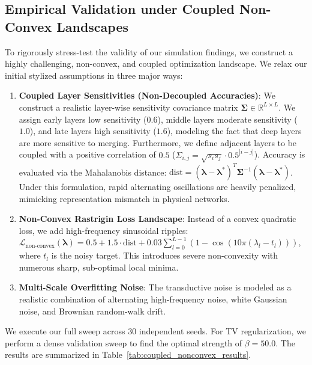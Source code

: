 \subsection{Empirical Validation under Coupled Non-Convex Landscapes}
To rigorously stress-test the validity of our simulation findings, we construct a highly challenging, non-convex, and coupled optimization landscape. We relax our initial stylized assumptions in three major ways:
\begin{enumerate}
    \item \textbf{Coupled Layer Sensitivities (Non-Decoupled Accuracies)}: We construct a realistic layer-wise sensitivity covariance matrix $\boldsymbol{\Sigma} \in \mathbb{R}^{L \times L}$. We assign early layers low sensitivity ($0.6$), middle layers moderate sensitivity ($1.0$), and late layers high sensitivity ($1.6$), modeling the fact that deep layers are more sensitive to merging. Furthermore, we define adjacent layers to be coupled with a positive correlation of $0.5$ ($\Sigma_{i,j} = \sqrt{s_i s_j} \cdot 0.5^{|i-j|}$). Accuracy is evaluated via the Mahalanobis distance: $\text{dist} = (\boldsymbol{\lambda} - \boldsymbol{\lambda}^*)^T \boldsymbol{\Sigma}^{-1} (\boldsymbol{\lambda} - \boldsymbol{\lambda}^*)$. Under this formulation, rapid alternating oscillations are heavily penalized, mimicking representation mismatch in physical networks.
    \item \textbf{Non-Convex Rastrigin Loss Landscape}: Instead of a convex quadratic loss, we add high-frequency sinusoidal ripples: $\mathcal{L}_{\text{non-convex}}(\boldsymbol{\lambda}) = 0.5 + 1.5 \cdot \text{dist} + 0.03 \sum_{l=0}^{L-1} (1 - \cos(10 \pi (\lambda_l - t_l)))$, where $t_l$ is the noisy target. This introduces severe non-convexity with numerous sharp, sub-optimal local minima.
    \item \textbf{Multi-Scale Overfitting Noise}: The transductive noise is modeled as a realistic combination of alternating high-frequency noise, white Gaussian noise, and Brownian random-walk drift.
\end{enumerate}

We execute our full sweep across 30 independent seeds. For TV regularization, we perform a dense validation sweep to find the optimal strength of $\beta = 50.0$. The results are summarized in Table~\ref{tab:coupled_nonconvex_results}.

